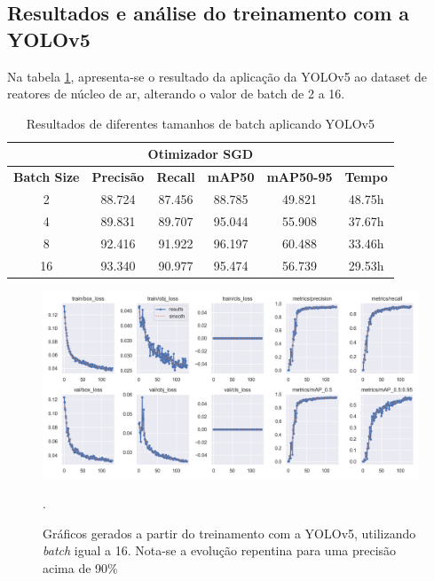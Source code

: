 \subsection{Resultados e análise do treinamento com a YOLOv5}

Na tabela \ref{tab:yolov5-teste}, apresenta-se o resultado da aplicação da YOLOv5 ao dataset de reatores de núcleo de ar, alterando o valor de batch de 2 a 16.

\begin{table}[!hbt]
    \centering
    \begin{tabular}{|c|c|c|c|c|c|}
    \hline
    \multicolumn{6}{|c|}{\textbf{Otimizador SGD}} \\ \hline
    \textbf{Batch Size} & \textbf{Precisão} & \textbf{Recall} & \textbf{mAP50} & \textbf{mAP50-95} & \textbf{Tempo} \\ \hline
    2                   & 88.724                & 87.456               & 88.785              & 49.821                 & 48.75h             \\ \hline
    4                   & 89.831                 & 89.707               & 95.044             & 55.908                & 37.67h             \\ \hline
    8                   & 92.416                 & 91.922               & 96.197              & 60.488                 & 33.46h             \\ \hline
    16                  & 93.340                 & 90.977               & 95.474              & 56.739                 & 29.53h             \\ \hline
    \end{tabular}
    \caption{Resultados de diferentes tamanhos de batch aplicando YOLOv5}
    \label{tab:yolov5-teste}
\end{table}

\begin{figure}[!h]
    \centering
    \begin{minipage}{1\linewidth}
    \centering
    \captionsetup{justification=centering,margin=0.5cm,font=small}
    \includegraphics[width=1\linewidth]{img/cap6/results-yolov5-batch-16.png}
    \caption{Gráficos gerados a partir do treinamento com a YOLOv5, utilizando \textit{batch} igual a 16. Nota-se a evolução repentina para uma precisão acima de 90\%}.
    \label{fig:yolov5batch16}
    \end{minipage}
\end{figure}


